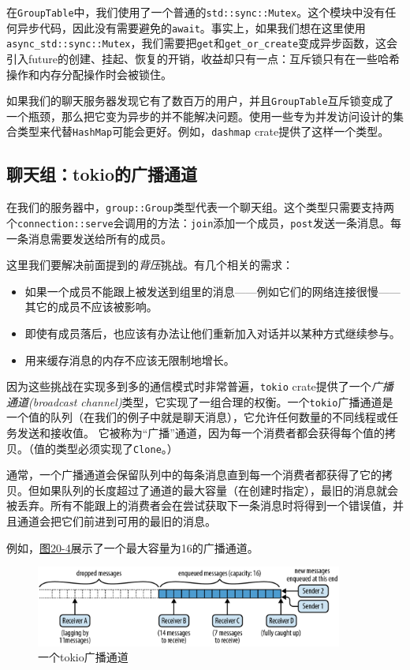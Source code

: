在\texttt{GroupTable}中，我们使用了一个普通的\texttt{std::sync::Mutex}。这个模块中没有任何异步代码，因此没有需要避免的\texttt{await}。事实上，如果我们想在这里使用\texttt{async\_std::sync::Mutex}，我们需要把\texttt{get}和\texttt{get\_or\_create}变成异步函数，这会引入future的创建、挂起、恢复的开销，收益却只有一点：互斥锁只有在一些哈希操作和内存分配操作时会被锁住。

如果我们的聊天服务器发现它有了数百万的用户，并且\texttt{GroupTable}互斥锁变成了一个瓶颈，那么把它变为异步的并不能解决问题。使用一些专为并发访问设计的集合类型来代替\texttt{HashMap}可能会更好。例如，\texttt{dashmap} crate提供了这样一个类型。

\subsection{聊天组：tokio的广播通道}
在我们的服务器中，\texttt{group::Group}类型代表一个聊天组。这个类型只需要支持两个\texttt{connection::serve}会调用的方法：\texttt{join}添加一个成员，\texttt{post}发送一条消息。每一条消息需要发送给所有的成员。

这里我们要解决前面提到的\emph{背压}挑战。有几个相关的需求：
\begin{itemize}
    \item 如果一个成员不能跟上被发送到组里的消息——例如它们的网络连接很慢——其它的成员不应该被影响。
    \item 即使有成员落后，也应该有办法让他们重新加入对话并以某种方式继续参与。
    \item 用来缓存消息的内存不应该无限制地增长。
\end{itemize}

因为这些挑战在实现多到多的通信模式时非常普遍，\texttt{tokio} crate提供了一个\emph{广播通道(broadcast channel)}类型，它实现了一组合理的权衡。一个\texttt{tokio}广播通道是一个值的队列（在我们的例子中就是聊天消息），它允许任何数量的不同线程或任务发送和接收值。 它被称为“广播”通道，因为每一个消费者都会获得每个值的拷贝。（值的类型必须实现了\texttt{Clone}。）

通常，一个广播通道会保留队列中的每条消息直到每一个消费者都获得了它的拷贝。但如果队列的长度超过了通道的最大容量（在创建时指定），最旧的消息就会被丢弃。所有不能跟上的消费者会在尝试获取下一条消息时将得到一个错误值，并且通道会把它们前进到可用的最旧的消息。

例如，\hyperref[f20-4]{图20-4}展示了一个最大容量为16的广播通道。
\begin{figure}[htbp]
    \centering
    \includegraphics[width=0.9\textwidth]{../img/f20-4.png}
    \caption{一个tokio广播通道}
    \label{f20-4}
\end{figure}

